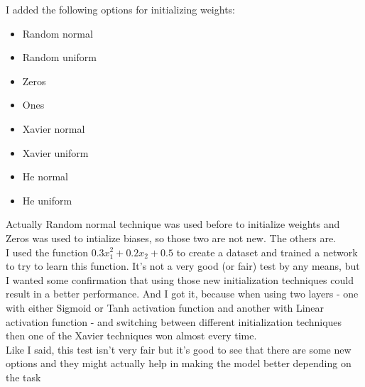 \documentclass{article}
\begin{document}
I added the following options for initializing weights:
\begin{itemize}
    \item Random normal
    \item Random uniform
    \item Zeros
    \item Ones 
    \item Xavier normal 
    \item Xavier uniform 
    \item He normal 
    \item He uniform
\end{itemize}

Actually Random normal technique was used before to initialize weights and Zeros was used 
to intialize biases, so those two are not new. The others are. \\

I used the function $0.3x_{1}^{2} + 0.2x_{2} + 0.5$ to create a dataset and trained a network to 
try to learn this function. It's not a very good (or fair) test by any means, but I wanted some confirmation 
that using those new initialization techniques could result in a better performance. And I got it, because 
when using two layers - one with either Sigmoid or Tanh activation function and another with Linear 
activation function - and switching between different initialization techniques then one of the Xavier 
techniques won almost every time. \\

Like I said, this test isn't very fair but it's good to see that there are some new options and they might 
actually help in making the model better depending on the task \\
\end{document}
